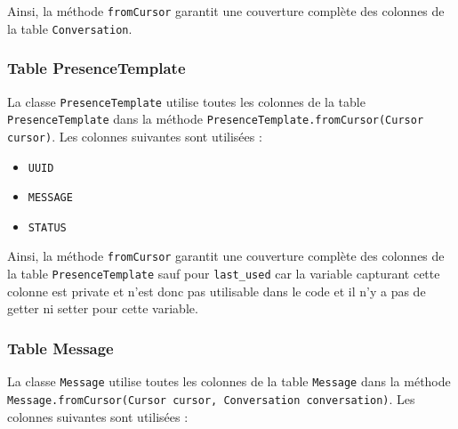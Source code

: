 \documentclass[a4paper,11pt]{article}
\begin{document}
Ainsi, la méthode \texttt{fromCursor} garantit une couverture complète des colonnes de la table \texttt{Conversation}.

\subsubsection*{Table PresenceTemplate}

La classe \texttt{PresenceTemplate} utilise toutes les colonnes de la table \texttt{PresenceTemplate} dans la méthode \texttt{PresenceTemplate.fromCursor(Cursor cursor)}. Les colonnes suivantes sont utilisées :

\begin{itemize}
    \item \texttt{UUID}
    \item \texttt{MESSAGE}
    \item \texttt{STATUS}
\end{itemize}

Ainsi, la méthode \texttt{fromCursor} garantit une couverture complète des colonnes de la table \texttt{PresenceTemplate} sauf pour \texttt{last\_used} car la variable capturant cette colonne est private et n'est donc pas utilisable dans le code et il n'y a pas de getter ni setter pour cette variable.


\subsubsection*{Table Message}

La classe \texttt{Message} utilise toutes les colonnes de la table \texttt{Message} dans la méthode \texttt{Message.fromCursor(Cursor cursor, Conversation conversation)}. Les colonnes suivantes sont utilisées :
\end{document}
